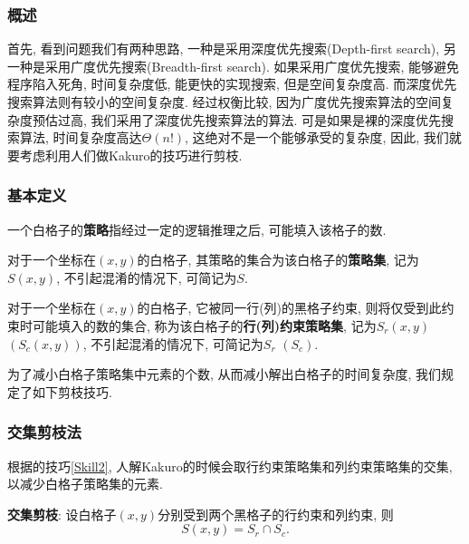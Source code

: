         \subsubsection{概述}
            首先, 看到问题我们有两种思路,
            一种是采用深度优先搜索(Depth-first search),
            另一种是采用广度优先搜索(Breadth-first search).
            如果采用广度优先搜索, 能够避免程序陷入死角, 时间复杂度低, 能更快的实现搜索, 但是空间复杂度高.
            而深度优先搜索算法则有较小的空间复杂度.
            经过权衡比较, 因为广度优先搜索算法的空间复杂度预估过高, 我们采用了深度优先搜索算法的算法.
            可是如果是裸的深度优先搜索算法, 时间复杂度高达$\Theta(n!)$, 这绝对不是一个能够承受的复杂度,
            因此, 我们就要考虑利用人们做Kakuro的技巧进行剪枝.
        \subsubsection{基本定义}
            \begin{dfn}
                一个白格子的\textbf{策略}指经过一定的逻辑推理之后, 可能填入该格子的数.
            \end{dfn}
            \begin{dfn}\label{dfnSet}
                对于一个坐标在$(x,y)$的白格子, 其策略的集合为该白格子的\textbf{策略集},
                记为$S(x,y)$, 不引起混淆的情况下, 可简记为$S$.
            \end{dfn}
            \begin{dfn}\label{dfnRow}
                对于一个坐标在$(x,y)$的白格子, 它被同一行(列)的黑格子约束,
                则将仅受到此约束时可能填入的数的集合,
                称为该白格子的\textbf{行(列)约束策略集}, 记为$S_{r}(x,y)$ $(S_{c}(x,y))$,
                不引起混淆的情况下, 可简记为$S_{r}$ $(S_{c})$.
            \end{dfn}
            为了减小白格子策略集中元素的个数, 从而减小解出白格子的时间复杂度, 我们规定了如下剪枝技巧.

        \subsubsection{交集剪枝法}
            根据的技巧\ref{Skill2},
            人解Kakuro的时候会取行约束策略集和列约束策略集的交集,
            以减少白格子策略集的元素.

            \label{dfnCap}\textbf{交集剪枝}:
                设白格子$(x,y)$分别受到两个黑格子的行约束和列约束, 则\[S(x,y)=S_{r} \cap S_{c}.\]
